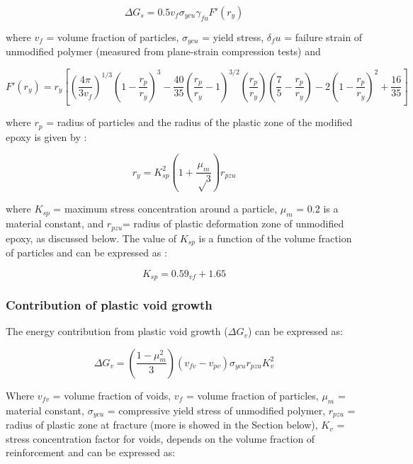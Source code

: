 \documentclass[numbers=noendperiod,chapterprefix=on]{icldt} %
\begin{document}
\begin{equation} 
\Delta G_s=0.5 v_f \sigma_{ycu} \gamma_{fu} F' (r_y)
\end{equation}

where $v_f$ = volume fraction of particles, $\sigma_{ycu}$ = yield stress, $\delta_fu$ = failure strain of unmodified polymer (measured from plane-strain compression tests) and

\begin{equation} 
F'(r_y)=r_y \left[\left(\frac{4\pi}{3v_f}\right)^{1/3} \left( 1-\frac{r_p}{r_y} \right)^3-
\frac{40}{35} \left( \frac{r_p}{r_y}-1\right) ^{3/2}
(\frac{r_p}{r_y})\left(\frac{7}{5}-\frac{r_p}{r_y}\right) 
-2\left(1- \frac{r_p}{r_y}\right) ^2
+\frac{16}{35}\right]
\end{equation}

where $r_p$ = radius of particles and the radius of the plastic zone of the modified epoxy is given by :

\begin{equation} 
r_y= K_{sp}^2 \left( 1+\frac{\mu_m}{√3}\right)r_{pzu}
\end{equation}

where $K_{sp}$ = maximum stress concentration around a particle, $\mu_{m}$ = 0.2 is a material constant, and $r_{pzu}$= radius of plastic deformation zone of unmodified epoxy, as discussed below. The value of $K_{sp}$ is a function of the volume fraction of particles and can be expressed as \cite{Chen2013}:

\begin{equation} 
K_{sp}=0.59_{vf}+1.65
\end{equation}

\subsubsection{Contribution of plastic void growth}
The energy contribution from plastic void growth ($\Delta G_v$) can be expressed as:

\begin{equation} 
\Delta G_v=\left( \frac{1-\mu_m^2}{3}\right) 
\left( v_{fv}-v_{pv}\right) 
\sigma_{ycu} r_{pzu} K_v^2
\end{equation}

Where $v_{fv}$ = volume fraction of voids, $v_{f}$ = volume fraction of particles, $\mu_m$ = material constant, $\sigma_{ycu}$ = compressive yield stress of unmodified polymer, $r_{pzu}$ = radius of plastic zone at fracture (more is showed in the Section below), $K_v$ = stress concentration factor for voids, depends on the volume fraction of reinforcement and can be expressed as:
\end{document}
